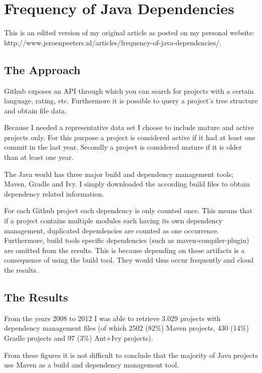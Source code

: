 \section{Frequency of Java Dependencies}
\label{appendix:frequency-of-java-dependencies}

{\small This is an edited version of my original article as posted on my personal website: http://www.jeroenpeeters.nl/articles/frequency-of-java-dependencies/}.

\subsection{The Approach}

Github exposes an API through which you can search for projects with a certain language, rating, etc. Furthermore it is possible to query a project’s tree structure and obtain file data.

Because I needed a representative data set I choose to include mature and active projects only. For this purpose a project is considered active if it had at least one commit in the last year. Secondly a project is considered mature if it is older than at least one year.

The Java world has three major build and dependency management tools; Maven, Gradle and Ivy. I simply downloaded the according build files to obtain dependency related information.

For each Github project each dependency is only counted once. This means that if a project contains multiple modules each having its own dependency management, duplicated dependencies are counted as one occurrence. Furthermore, build tools specific dependencies (such as maven-compiler-plugin) are omitted from the results. This is because depending on these artifacts is a consequence of using the build tool. They would thus occur frequently and cloud the results.

\subsection{The Results}

From the years 2008 to 2012 I was able to retrieve 3.029 projects with dependency management files (of which 2502 (82\%) Maven projects, 430 (14\%) Gradle projects and 97 (3\%) Ant+Ivy projects).

From these figures it is not difficult to conclude that the majority of Java projects use Maven as a build and dependency management tool.

